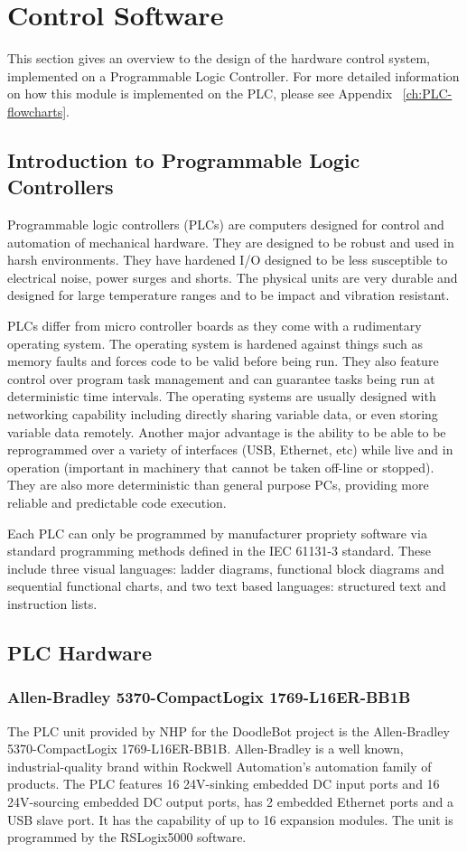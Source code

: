 \section{Control Software}

This section gives an overview to the design of the hardware control system, implemented on a Programmable Logic Controller. For more detailed information on how this module is implemented on the PLC, please see Appendix ~\ref{ch:PLC-flowcharts}.

\subsection{Introduction to Programmable Logic Controllers}
	Programmable logic controllers (PLCs) are computers designed for control and automation of mechanical hardware. They are designed to be robust and used in harsh environments. They have hardened I/O designed to be less susceptible to electrical noise, power surges and shorts. The physical units are very durable and designed for large temperature ranges and to be impact and vibration resistant.
	
	PLCs differ from micro controller boards as they come with a rudimentary operating system. The operating system is hardened against things such as memory faults and forces code to be valid before being run. They also feature control over program task management and can guarantee tasks being run at deterministic time intervals. The operating systems are usually designed with networking capability including directly sharing variable data, or even storing variable data remotely. Another major advantage is the ability to be able to be reprogrammed over a variety of interfaces (USB, Ethernet, etc) while live and in operation (important in machinery that cannot be taken off-line or stopped). They are also more deterministic than general purpose PCs, providing more reliable and predictable code execution.
	
	Each PLC can only be programmed by manufacturer propriety software via standard programming methods defined in the IEC 61131-3 standard. These include three visual languages: ladder diagrams, functional block diagrams and sequential functional charts, and two text based languages: structured text and instruction lists.
	
\subsection{PLC Hardware}
	\subsubsection{Allen-Bradley 5370-CompactLogix 1769-L16ER-BB1B}
		The PLC unit provided by NHP for the DoodleBot project is the Allen-Bradley 5370-CompactLogix 1769-L16ER-BB1B. Allen-Bradley is a well known, industrial-quality brand within Rockwell Automation's automation family of products. The PLC features 16 24V-sinking embedded DC input ports and 16 24V-sourcing embedded DC output ports, has 2 embedded Ethernet ports and a USB slave port. It has the capability of up to 16 expansion modules. The unit is programmed by the RSLogix5000 software.
